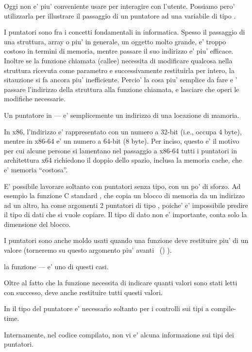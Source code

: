 


Oggi non e' piu' conveniente usare \scanf per interagire con l'utente. 
Possiamo pero' utilizzarla per illustrare il passaggio di un puntatore ad una variabile di tipo \Tint.

\myindex{\CLanguageElements!\Pointers}

I puntatori sono fra i concetti fondamentali in informatica.
Spesso il passaggio di una struttura, array o piu' in generale, un oggetto molto grande, e' troppo costoso in termini di memoria, mentre passare il suo indirizzo e' piu' efficace. 
Inoltre se la funzione chiamata (\gls{callee}) necessita di modificare qualcosa nella struttura ricevuta come parametro e successivamente restituirla per intero, la sitauzione si fa ancora piu' inefficiente.
Percio' la cosa piu' semplice da fare e ' passare l'indirizzo della struttura alla funzione chiamata, e lasciare che operi le modifiche necessarie.

Un puntatore in \CCpp--- e' semplicemente un indirizzo di una locazione di mamoria.

In x86, l'indirizzo e' rappresentato con un numero a 32-bit (i.e., occupa 4 byte), mentre in x86-64 e' un numero a 64-bit (8 byte).
Per inciso, questo e' il motivo per cui alcune persone si lamentano nel passaggio a x86-64\EMDASH{} tutti i puntatori in architettura x64 richiedono il doppio dello spazio, inclusa la memoria cache, che e' memoria ``costosa''.

E' possibile lavorare soltanto con puntatori senza tipo, con un po' di sforzo. Ad esempio la funzione C standard , che copia un blocco di memoria da un indirizzo ad un altro, ha come argomenti 2 puntatori di tipo , poiche' e' impossibile predire il tipo di dati che si vuole copiare. Il tipo di dato non e' importante, conta solo la dimensione del blocco.

I puntatori sono anche moldo usati quando una funzione deve restituire piu' di un valore
(torneremo su questo argomento piu' avanti
~()
).

la funzione  --- e' uno di questi casi.

Oltre al fatto che la funzione necessita di indicare quanti valori sono stati letti con successo, deve anche restituire tutti questi valori.

In \CCpp il tipo del puntatore e' necessario soltanto per i controlli sui tipi a compile-time.

Internamente, nel codice compilato, non vi e' alcuna informazione sui tipi dei puntatori.





